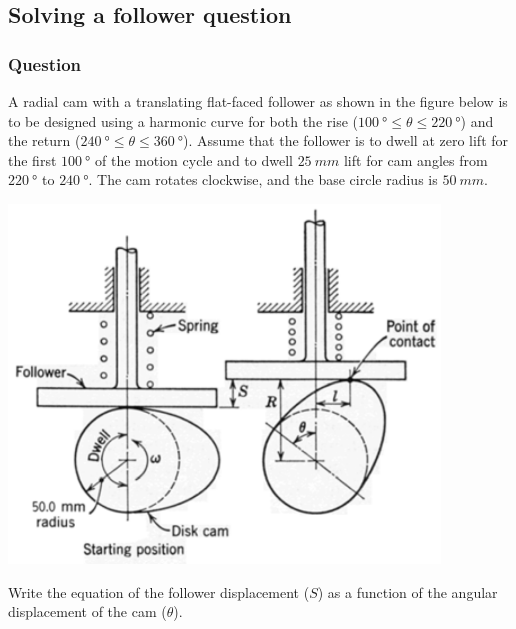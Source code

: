 \documentclass[11pt]{article}
\begin{document}
\subsection{Solving a follower question}
\label{sec:org14a227b}
\label{org3cc19e4}
\subsubsection{Question}
\label{sec:org0cf7f07}
A radial cam with a translating flat-faced follower as shown in the figure below is to be designed using a harmonic curve for both the rise (\(\qty{100}{\degree} \le \theta \le \qty{220}{\degree}\)) and the return (\(\qty{240}{\degree} \le \theta \le \qty{360}{\degree}\)). Assume that the follower is to dwell at zero lift for the first \(\qty{100}{\degree}\) of the motion cycle and to dwell \(\qty{25}{mm}\) lift for cam angles from \(\qty{220}{\degree}\) to \(\qty{240}{\degree}\). The cam rotates clockwise, and the base circle radius is \(\qty{50}{mm}\).

\begin{center}
\includegraphics[width=.9\linewidth]{./images/follower-question-example.png}
\end{center}

Write the equation of the follower displacement (\(S\)) as a function of the angular displacement of the cam (\(\theta\)).

 \newpage
\end{document}

